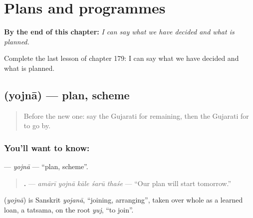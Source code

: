
\chapter{Plans and programmes}
\label{ch:gu-plans-and-programmes}

\begin{chapteropening}
\textbf{By the end of this chapter:} \emph{I can say what we have decided and what is planned.}

Complete the last lesson of chapter 179: I can say what we have decided and what is planned.
\end{chapteropening}

\section[\texorpdfstring{\gu{યોજના} (yojnā)}{યોજના (yojnā)}]{ (yojnā) — plan, scheme}

\label{lesson:GU-C179-yojna}



\begin{quote}
Before the new one: say the Gujarati for remaining, then the Gujarati for to go by.
\end{quote}

\subsection*{You'll want to know: }
\textbf{} — \emph{yojnā} — \textquotedblleft{}plan, scheme\textquotedblright{}.

\begin{quote}
\textbf{    .} — \emph{amārī yojnā kāle śarū thaśe} — \textquotedblleft{}Our plan will start tomorrow.\textquotedblright{}
\end{quote}

\begin{cousinweb}
\textbf{} (\emph{yojnā}) is Sanskrit \emph{yojanā}, \textquotedblleft{}joining, arranging\textquotedblright{}, taken over whole as a learned loan, a tatsama, on the root \emph{yuj}, \textquotedblleft{}to join\textquotedblright{}.
\end{cousinweb}

